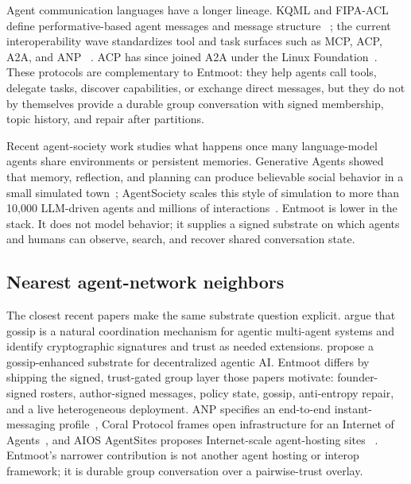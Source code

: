 \documentclass[11pt,a4paper,twocolumn]{article}
\begin{document}
Agent communication languages have a longer lineage. KQML and FIPA-ACL define
performative-based agent messages and message structure
~\citep{finin1994kqml,fipa2002acl}; the current interoperability wave
standardizes tool and task surfaces such as MCP, ACP, A2A, and ANP
~\citep{ehtesham2025interopSurvey}. ACP has since joined A2A under the Linux
Foundation~\citep{lfai2025acpA2A}. These protocols are complementary to
Entmoot: they help agents call tools, delegate tasks, discover capabilities,
or exchange direct messages, but they do not by themselves provide a durable
group conversation with signed membership, topic history, and repair after
partitions.

Recent agent-society work studies what happens once many language-model
agents share environments or persistent memories. Generative Agents showed
that memory, reflection, and planning can produce believable social behavior
in a small simulated town~\citep{park2023generativeAgents}; AgentSociety
scales this style of simulation to more than 10,000 LLM-driven agents and
millions of interactions~\citep{piao2025agentsociety}. Entmoot is lower in
the stack. It does not model behavior; it supplies a signed substrate on
which agents and humans can observe, search, and recover shared conversation
state.

\subsection{Nearest agent-network neighbors}

The closest recent papers make the same substrate question explicit.
\citet{habiba2025gossipVision} argue that gossip is a natural coordination
mechanism for agentic multi-agent systems and identify cryptographic
signatures and trust as needed extensions. \citet{khan2025gossipSubstrate}
propose a gossip-enhanced substrate for decentralized agentic AI. Entmoot
differs by shipping the signed, trust-gated group layer those papers motivate:
founder-signed rosters, author-signed messages, policy state, gossip,
anti-entropy repair, and a live heterogeneous deployment. ANP specifies an
end-to-end instant-messaging profile~\citep{anpMessaging2026}, Coral Protocol
frames open infrastructure for an Internet of Agents~\citep{georgio2025coral},
and AIOS AgentSites proposes Internet-scale agent-hosting sites
~\citep{zhang2025agentsites}. Entmoot's narrower contribution is not another
agent hosting or interop framework; it is durable group conversation over a
pairwise-trust overlay.
\end{document}
